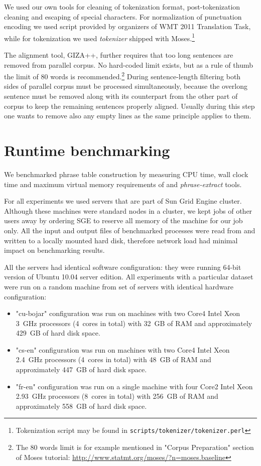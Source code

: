 We used our own tools for cleaning of tokenization format,
post-tokenization cleaning and escaping of special characters.
For normalization of punctuation encoding we used script provided by organizers of
WMT 2011 Translation Task,
while for tokenization we used \emph{tokenizer} shipped with
Moses.\footnote{Tokenization script may be found in \texttt{scripts/tokenizer/tokenizer.perl}}

The alignment tool, GIZA++, further requires that too long sentences are removed from parallel corpus.
No hard-coded limit exists, but as a rule of thumb the limit of 80 words is
recommended.\footnote{The 80 words limit is for example mentioned in "Corpus Preparation" section of Moses tutorial:
\url{http://www.statmt.org/moses/?n=moses.baseline}}
During sentence-length filtering both sides of parallel corpus must be processed simultaneously,
because the overlong sentence must be removed along with its counterpart from the other part of corpus
to keep the remaining sentences properly aligned.
Usually during this step one wants to remove also any empty lines as the same principle applies to them.

\section{Runtime benchmarking}

We benchmarked phrase table construction by measuring CPU time, wall clock time
and maximum virtual memory requirements of \eppex{} and \emph{phrase-extract} tools.

For all experiments we used servers that are part of Sun Grid Engine cluster.
Although these machines were standard nodes in a cluster, we kept jobs of other
users away by ordering SGE to reserve all memory of the machine for our job only.
All the input and output files of benchmarked processes were read from and written
to a locally mounted hard disk, therefore network load had minimal impact on
benchmarking results.

All the servers had identical software configuration:
they were running 64-bit version of Ubuntu 10.04 server edition.
All experiments with a particular dataset were run on a random machine from
set of servers with identical hardware configuration:
\begin{itemize}
  \item "cu-bojar" configuration was run on machines with two Core4 Intel Xeon 3~GHz
  processors (4~cores in total) with 32~GB of RAM and approximately 429~GB of
  hard disk space. %
  \item "cs-en" configuration was run on machines with two Core4 Intel Xeon 2.4~GHz
  processors (4~cores in total) with 48~GB of RAM and approximately 447~GB of
  hard disk space. %
  \item "fr-en" configuration was run on a single machine with four Core2 Intel Xeon
  2.93~GHz processors (8~cores in total) with 256~GB of RAM and approximately
  558~GB of hard disk space. %
\end{itemize}

